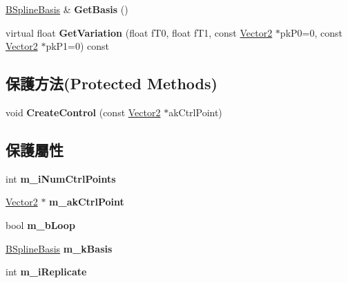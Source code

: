 \begin{DoxyCompactItemize}
\item 
\hyperlink{class_magnum_1_1_b_spline_basis}{B\+Spline\+Basis} \& {\bfseries Get\+Basis} ()\hypertarget{class_magnum_1_1_b_spline_curve2_adf9d5d3ca178dcd86cff68e78e52e052}{}\label{class_magnum_1_1_b_spline_curve2_adf9d5d3ca178dcd86cff68e78e52e052}

\item 
virtual float {\bfseries Get\+Variation} (float f\+T0, float f\+T1, const \hyperlink{class_magnum_1_1_vector2}{Vector2} $\ast$pk\+P0=0, const \hyperlink{class_magnum_1_1_vector2}{Vector2} $\ast$pk\+P1=0) const \hypertarget{class_magnum_1_1_b_spline_curve2_ac38da24ec71ae568d5603c6824a1c8b0}{}\label{class_magnum_1_1_b_spline_curve2_ac38da24ec71ae568d5603c6824a1c8b0}

\end{DoxyCompactItemize}
\subsection*{保護方法(Protected Methods)}
\begin{DoxyCompactItemize}
\item 
void {\bfseries Create\+Control} (const \hyperlink{class_magnum_1_1_vector2}{Vector2} $\ast$ak\+Ctrl\+Point)\hypertarget{class_magnum_1_1_b_spline_curve2_abb1225d7a35fd571a64de82e6826e3cb}{}\label{class_magnum_1_1_b_spline_curve2_abb1225d7a35fd571a64de82e6826e3cb}

\end{DoxyCompactItemize}
\subsection*{保護屬性}
\begin{DoxyCompactItemize}
\item 
int {\bfseries m\+\_\+i\+Num\+Ctrl\+Points}\hypertarget{class_magnum_1_1_b_spline_curve2_a5d9b1893c39fec130604f43c8ed85fd1}{}\label{class_magnum_1_1_b_spline_curve2_a5d9b1893c39fec130604f43c8ed85fd1}

\item 
\hyperlink{class_magnum_1_1_vector2}{Vector2} $\ast$ {\bfseries m\+\_\+ak\+Ctrl\+Point}\hypertarget{class_magnum_1_1_b_spline_curve2_af208ddd441b9e1c67e7adc4b4dd7cd5c}{}\label{class_magnum_1_1_b_spline_curve2_af208ddd441b9e1c67e7adc4b4dd7cd5c}

\item 
bool {\bfseries m\+\_\+b\+Loop}\hypertarget{class_magnum_1_1_b_spline_curve2_ad1ed971a10a006d8fc23d577d0526ca6}{}\label{class_magnum_1_1_b_spline_curve2_ad1ed971a10a006d8fc23d577d0526ca6}

\item 
\hyperlink{class_magnum_1_1_b_spline_basis}{B\+Spline\+Basis} {\bfseries m\+\_\+k\+Basis}\hypertarget{class_magnum_1_1_b_spline_curve2_a79c8b5e7826dee9af5e300bfe995bf92}{}\label{class_magnum_1_1_b_spline_curve2_a79c8b5e7826dee9af5e300bfe995bf92}

\item 
int {\bfseries m\+\_\+i\+Replicate}\hypertarget{class_magnum_1_1_b_spline_curve2_ae968f24cd822ca16a1e85567cc954dab}{}\label{class_magnum_1_1_b_spline_curve2_ae968f24cd822ca16a1e85567cc954dab}

\end{DoxyCompactItemize}

